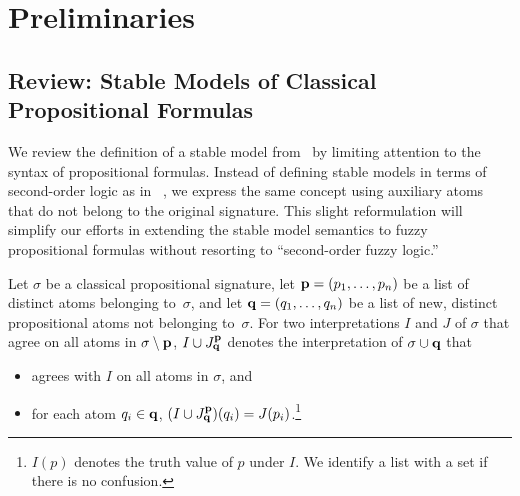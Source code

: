 \documentclass[runningheads]{llncs}
\def\bi{\begin{itemize}}
\def\ei{\end{itemize}}
\begin{document}

\vspace{-0.3cm}
\section{Preliminaries} \label{sec:prelim} 

\subsection{Review: Stable Models of Classical Propositional
  Formulas}  \label{ssec:review-sm} 

We review the definition of a stable model
from~\cite{ferraris11stable} by limiting attention to the syntax of
propositional formulas. Instead of defining stable models in terms of second-order logic as in~\cite{ferraris11stable} , we express the same concept using auxiliary atoms that do not belong to the original signature. This slight reformulation
will simplify our efforts in extending the stable model semantics to fuzzy
propositional formulas without resorting to ``second-order fuzzy
logic.''

Let $\sigma$ be a classical propositional signature, 
let ${\bf p}=(p_1,\dots, p_n)$ be a list of distinct atoms belonging
to~$\sigma$, and let ${\bf q}=(q_1,\dots,q_n)$ be a list of new, distinct
propositional atoms not belonging to~$\sigma$.  
%
For two interpretations $I$ and $J$ of $\sigma$ that agree on all
atoms in $\sigma\setminus {\bf p}$, $I\cup J^{\bf p}_{\bf q}$ denotes the
interpretation of $\sigma\cup{\bf q}$ that 
\bi
\item  agrees with $I$ on all atoms in $\sigma$, and
\item  for each atom $q_i\in {\bf q}$, 
       $(I\cup J^{\bf p}_{\bf q})(q_i) = J(p_i)$.\footnote{%
$I(p)$ denotes the truth value of $p$ under $I$.
We identify a list with a set if there is no confusion.} 
\ei
\end{document}
